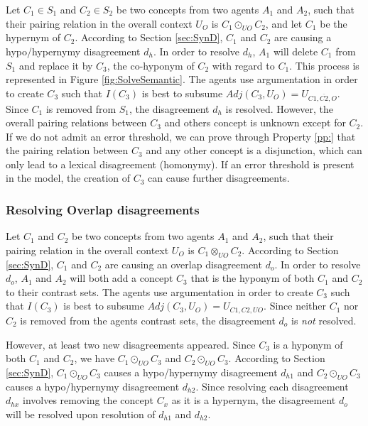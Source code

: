 Let $C_{1} \in S_{1}$ and $C_{2} \in S_{2}$ be two concepts from two agents $A_{1}$ and $A_{2}$, such that their pairing relation in the overall context $U_{O}$ is $C_{1} \odot_{UO} C_{2}$, and let $C_{1}$ be the hypernym of $C_{2}$. According to Section \ref{sec:SynD}, $C_{1}$ and $C_{2}$ are causing a hypo/hypernymy disagreement $d_{h}$.
In order to resolve $d_{h}$, $A_{1}$ will delete $C_{1}$ from $S_{1}$ and replace it by $C_{3}$, the co-hyponym of $C_{2}$ with regard to $C_{1}$. This process is represented in Figure \ref{fig:SolveSemantic}. The agents use argumentation in order to create $C_{3}$ such that $I(C_{3})$ is best to subsume $Adj(C_{3}, U_{O}) = U_{C1,\overbar{C2},O}$. Since $C_{1}$ is removed from $S_{1}$, the disagreement $d_{h}$ is resolved. However, the overall pairing relations between $C_{3}$ and others concept is unknown except for $C_{2}$.
If we do not admit an error threshold, we can prove through Property \ref{pp:} that the pairing relation between $C_{3}$ and any other concept is a disjunction, which can only lead to a lexical disagreement (homonymy). If an error threshold is present in the model, the creation of $C_{3}$ can cause further disagreements.

\subsubsection{Resolving Overlap disagreements}

Let $C_{1}$ and $C_{2}$ be two concepts from two agents $A_{1}$ and $A_{2}$, such that their pairing relation in the overall context $U_{O}$ is $C_{1} \otimes_{UO} C_{2}$. According to Section \ref{sec:SynD}, $C_{1}$ and $C_{2}$ are causing an overlap disagreement $d_{o}$.
In order to resolve $d_{o}$, $A_{1}$ and $A_{2}$ will both add a concept $C_{3}$ that is the hyponym of both $C_{1}$ and $C_{2}$ to their contrast sets. The agents use argumentation in order to create $C_{3}$ such that $I(C_{3})$ is best to subsume $Adj(C_{3}, U_{O}) = U_{C1,C2,UO}$. Since neither $C_{1}$ nor $C_{2}$ is removed from the agents contrast sets, the disagreement $d_{o}$ is \emph{not} resolved.

However, at least two new disagreements appeared. Since $C_{3}$ is a hyponym of both $C_{1}$ and $C_{2}$, we have $C_{1} \odot_{UO} C_{3}$ and $C_{2} \odot_{UO} C_{3}$. According to Section \ref{sec:SynD}, $C_{1} \odot_{UO} C_{3}$ causes a hypo/hypernymy disagreement $d_{h1}$ and $C_{2} \odot_{UO} C_{3}$ causes a hypo/hypernymy disagreement $d_{h2}$. Since resolving each disagreement $d_{hx}$ involves removing the concept $C_{x}$ as it is a hypernym, the disagreement $d_{o}$ will be resolved upon resolution of $d_{h1}$ and $d_{h2}$.


 